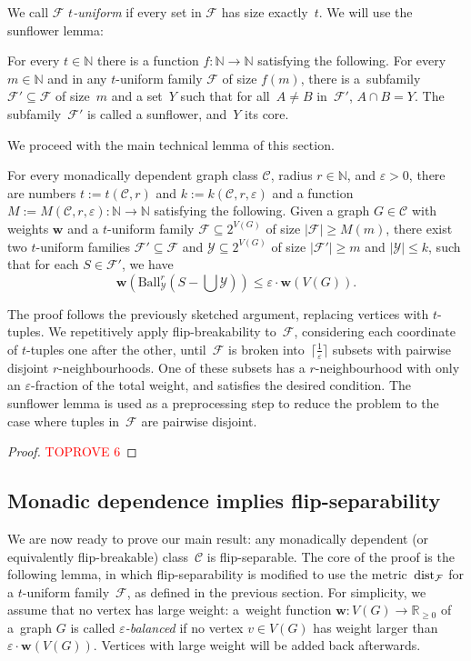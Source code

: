 \documentclass[a4paper,UKenglish,cleveref, autoref, thm-restate]{lipics-v2021}
\newcommand{\eps}{\varepsilon}
\newcommand{\R}{\mathbb{R}}
\newcommand{\YY}{\mathcal{Y}}
\newcommand{\N}[0]{\mathrm{\mathbb{N}}}
\renewcommand{\subset}{\subseteq}
\newcommand{\dist}{\textnormal{dist}}
\newcommand{\ceil}[1]{\lceil #1 \rceil}
\newcommand{\weight}{\mathbf{w}}
\newcommand{\CC}{\mathcal{C}}
\newcommand{\FF}{\mathcal{F}}
\renewcommand{\le}{\leqslant}
\renewcommand{\leq}{\le}
\renewcommand{\ge}{\geqslant}
\renewcommand{\geq}{\ge}
\newcommand{\Ball}{\mathrm{Ball}}
\begin{document}
We call $\FF$ \emph{$t$-uniform} if every set in $\FF$ has size exactly~$t$. We will use the sunflower lemma:
\begin{theorem}\label{lem:sunflower}
  For every $t \in \N$ there is a function $f:\N \to \N$ satisfying the following.
  For every $m \in \N$ and in any $t$-uniform family $\FF$ of size $f(m)$, there is a~subfamily $\FF' \subset \FF$ of size~$m$ and a set~$Y$ such that for all~$A \neq B$ in~$\FF'$, $A \cap B = Y$.
  The subfamily~$\FF'$ is called a sunflower, and~$Y$ its core.
\end{theorem}











We proceed with the main technical lemma of this section.

\begin{lemma}\label{lem:small-balls}
    For every monadically dependent graph class $\CC$,  radius $r \in \N$, and $\eps >0$, there are numbers $t := t(\CC,r)$ and $k := k(\CC, r, \eps)$ and a function $M := M(\CC,r,\eps) : \N \to \N$ satisfying the following.
    Given a graph $G\in\CC$ with weights $\weight$ and a $t$-uniform family $\FF \subseteq 2^{V(G)}$ of size $|\FF| \geq M(m)$,
    there exist two $t$-uniform families $\FF' \subseteq \FF$ and $\YY \subseteq 2^{V(G)}$ of size $|\FF'| \geq m$ and $|\YY| \leq k$,
    such that for each $S \in \FF'$, we have
    \[
        \weight(\Ball^r_\YY(S- \textstyle{\bigcup \YY})) \leq \eps \cdot \weight (V(G)).
    \]
\end{lemma}

The proof follows the previously sketched argument, replacing vertices with $t$-tuples.
We repetitively apply flip-breakability to~$\FF$, considering each coordinate of $t$-tuples one after the other,
until~$\FF$ is broken into~$\ceil{\frac{1}{\eps}}$ subsets with pairwise disjoint $r$-neighbourhoods.
One of these subsets has a $r$-neighbourhood with only an $\eps$-fraction of the total weight, and satisfies the desired condition.
The sunflower lemma is used as a preprocessing step to reduce the problem to the case where tuples in~$\FF$ are pairwise disjoint.
\begin{proof}\textcolor{red}{TOPROVE 6}\end{proof}


\subsection{Monadic dependence implies flip-separability}
We are now ready to prove our main result:
any monadically dependent (or equivalently flip-breakable) class~$\CC$ is flip-separable.
The core of the proof is the following lemma, in which flip-separability is modified to use the metric~$\dist_\FF$ for a $t$-uniform family~$\FF$, as defined in the previous section.
For simplicity, we assume that no vertex has large weight:
a~weight function $\weight \colon V(G) \to \R_{\geq 0}$ of a~graph $G$ is called \emph{$\eps$-balanced} if no vertex $v \in V(G)$ has weight larger than $\eps \cdot \weight(V(G))$.
Vertices with large weight will be added back afterwards.
\end{document}
